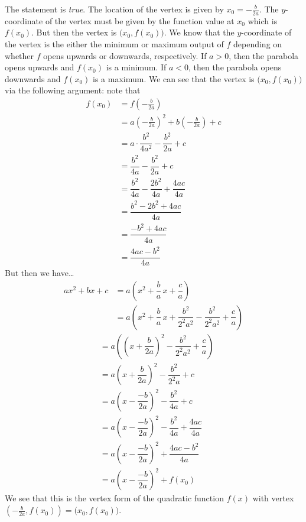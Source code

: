 \documentclass[11pt,letterpaper]{article}
\begin{document}
\sol The statement is \textit{true}. The location of the vertex is given by $x_0= -\frac{b}{2a}$. The $y$-coordinate of the vertex must be given by the function value at $x_0$ which is $f(x_0)$. But then the vertex is $\big(x_0, f(x_0) \big)$. We know that the $y$-coordinate of the vertex is the either the minimum or maximum output of $f$ depending on whether $f$ opens upwards or downwards, respectively. If $a > 0$, then the parabola opens upwards and $f(x_0)$ is a minimum. If $a < 0$, then the parabola opens downwards and $f(x_0)$ is a maximum. We can see that the vertex is $\big(x_0, f(x_0) \big)$ via the following argument: note that
	\[
	\begin{aligned}
	f(x_0)&= f \left(-\frac{b}{2a} \right) \\ 
	&= a \left(-\frac{b}{2a} \right)^2 + b \left(-\frac{b}{2a} \right) + c \\
	&= a \cdot \dfrac{b^2}{4a^2} - \dfrac{b^2}{2a} + c \\
	&= \dfrac{b^2}{4a} - \dfrac{b^2}{2a} + c \\
	&= \dfrac{b^2}{4a} - \dfrac{2b^2}{4a} + \dfrac{4ac}{4a} \\
	&= \dfrac{b^2 - 2b^2 + 4ac}{4a} \\
	&= \dfrac{-b^2 + 4ac}{4a} \\
	&= \dfrac{4ac - b^2}{4a}
	\end{aligned}
	\]
But then we have\dots
	\[
	\begin{aligned}
	ax^2 + bx + c&= a \left(x^2 + \dfrac{b}{a} \,x + \dfrac{c}{a} \right) \\
	&= a \left(x^2 + \dfrac{b}{a} \,x + \dfrac{b^2}{2^2a^2} - \dfrac{b^2}{2^2a^2} + \dfrac{c}{a} \right) 
	\end{aligned}
	\]
	\[
	\begin{aligned}
	&= a \left( \left(x + \dfrac{b}{2a} \right)^2 - \dfrac{b^2}{2^2a^2} + \dfrac{c}{a} \right) \\
	&= a \left(x + \dfrac{b}{2a} \right)^2 - \dfrac{b^2}{2^2a} + c \\
	&= a \left(x - \dfrac{-b}{2a} \right)^2 - \dfrac{b^2}{4a} + c \\
	&= a \left(x - \dfrac{-b}{2a} \right)^2 - \dfrac{b^2}{4a} + \dfrac{4ac}{4a} \\
	&= a \left(x - \dfrac{-b}{2a} \right)^2 + \dfrac{4ac - b^2}{4a} \\
	&= a \left(x - \dfrac{-b}{2a} \right)^2 + f(x_0)
	\end{aligned}
	\]
We see that this is the vertex form of the quadratic function $f(x)$ with vertex $(-\frac{b}{2a}, f(x_0))= \big(x_0, f(x_0) \big)$. \pvspace{1.3cm}
\end{document}
